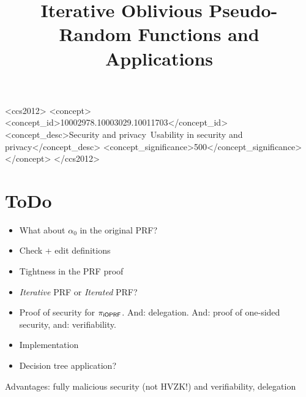 \documentclass[sigconf, anonymous]{acmart}
\begin{document}
\title{Iterative Oblivious Pseudo-Random Functions and Applications}
\begin{CCSXML}
<ccs2012>
<concept>
<concept_id>10002978.10003029.10011703</concept_id>
<concept_desc>Security and privacy~Usability in security and privacy</concept_desc>
<concept_significance>500</concept_significance>
</concept>
</ccs2012>
\end{CCSXML}





\maketitle

\section{ToDo}
\begin{itemize}
\item What about $\alpha_0$ in the original PRF?
\item Check + edit definitions
\item Tightness in the PRF proof
\item \emph{Iterative} PRF or \emph{Iterated} PRF?
\item Proof of security for ${\pi_{\mathsf{i}\mathsf{OPRF}}}$. And: delegation. And: proof of one-sided security, and: verifiability.
\item Implementation
\item Decision tree application?  
\end{itemize}

Advantages: fully malicious security (not HVZK!) and verifiability,
delegation








\end{document}
